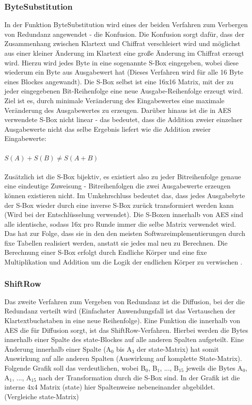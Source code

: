 \documentclass[10pt, a4paper,headsepline]{scrreprt}
\begin{document}
\subsubsection{ByteSubstitution}
In der Funktion ByteSubstitution wird eines der beiden Verfahren zum Verbergen von Redundanz angewendet - die Konfusion. Die Konfusion sorgt dafür, dass der Zusammenhang zwischen Klartext und Chiffrat verschleiert wird und möglichst aus einer kleiner Änderung im Klartext eine große Änderung im Chiffrat erzeugt wird. Hierzu wird jedes Byte in eine sogenannte S-Box eingegeben, wobei diese  wiederum ein Byte aus Ausgabewert hat (Dieses Verfahren wird für alle 16 Byte eines Blockes angewandt). Die S-Box selbst ist eine 16x16 Matrix, mit der zu jeder eingegebenen Bit-Reihenfolge eine neue Ausgabe-Reihenfolge erzeugt wird. Ziel ist es, durch minimale Veränderung des Eingabewertes eine maximale Veränderung des Ausgabewertes zu erzeugen. Darüber hinaus ist die in AES verwendete S-Box nicht linear - das bedeutet, dass die Addition zweier einzelner Ausgabewerte nicht das selbe Ergebnis liefert wie die Addition zweier Eingabewerte:\\ \\
\(S(A) + S(B) \neq S(A+B)\) \\ \\
Zusätzlich ist die S-Box bijektiv, es existiert also zu jeder Bitreihenfolge genaue eine eindeutige Zuweisung - Bitreihenfolgen die zwei Ausgabewerte erzeugen können existieren nicht. Im Umkehrschluss bedeutet das, dass jedes Ausgabebyte der S-Box wieder durch eine inverse S-Box zurück transformiert werden kann (Wird bei der Entschlüsselung verwendet). Die S-Boxen innerhalb von AES sind alle identische, sodass 16x pro Runde immer die selbe Matrix verwendet wird. Das hat zur Folge, dass sie in den den meisten Softwareimplementierungen durch fixe Tabellen realisiert werden, anstatt sie jedes mal neu zu Berechnen. Die Berechnung einer S-Box erfolgt durch Endliche Körper und eine fixe Multiplikation und Addition um die Logik der endlichen Körper zu verwischen \citep[S. 101ff]{book:understanding-crypto}.


\subsubsection{ShiftRow}
Das zweite Verfahren zum Vergeben von Redundanz ist die Diffusion, bei der die Redundanz verteilt wird (Einfachster Anwendungsfall ist das Vertauschen der Klartextbuchstaben in eine neue Reihenfolge). Eine Funktion die innerhalb von AES die für Diffusion sorgt, ist das ShiftRow-Verfahren. Hierbei werden die Bytes innerhalb einer Spalte des state-Blockes auf alle anderen Spalten aufgeteilt. Eine Änderung innerhalb einer Spalte (A$_{0}$ bis A$_{3}$ der state-Matrix) hat somit Auswirkung auf alle anderen Spalten (Auswirkung auf komplette State-Matrix). Folgende Grafik soll das verdeutlichen, wobei B$_{0}$, B$_{1}$, ..., B$_{15}$ jeweils die Bytes A$_{0}$, A$_{1}$, ..., A$_{15}$ nach der Transformation durch die S-Box sind. In der Grafik ist die interne 4x4 Matrix (state) hier Spaltenweise nebeneinander abgebildet. (Vergleiche state-Matrix)  \\ \\
\end{document}

